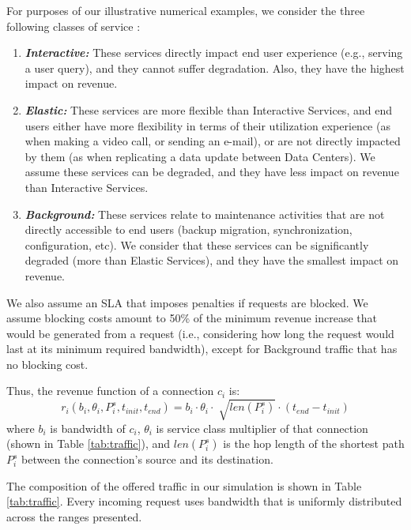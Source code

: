 \documentclass[journal]{IEEEtran}
\begin{document}
For purposes of our illustrative numerical examples, we consider the three following classes of service \cite{hong2013achieving}: 
\begin{enumerate}
\item \textit{\textbf{Interactive:}} These services directly impact end user experience (e.g., serving a user query), and they cannot suffer degradation. Also, they have the highest impact on revenue.

\item \textit{\textbf{Elastic:}} These services are more flexible than Interactive Services, and end users either have more flexibility in terms of their utilization experience (as when making a video call, or sending an e-mail), or are not directly impacted by them (as when replicating a data update between Data Centers). We assume these services can be degraded, and they have less impact on revenue than Interactive Services.

\item \textit{\textbf{Background:}} These services relate to maintenance activities that are not directly accessible to end users (backup migration, synchronization, configuration, etc). We consider that these services can be significantly degraded (more than Elastic Services), and they have the smallest impact on revenue.
\end{enumerate}

We also assume an SLA that imposes penalties if requests are blocked. We assume blocking costs amount to 50\% of the minimum revenue increase that would be generated from a request (i.e., considering how long the request would last at its minimum required bandwidth), except for Background traffic that has no blocking cost.

Thus, the revenue function of a connection $c_i$ is:
$$r_i(b_i, \theta_i, P_i^s, t_{init}, t_{end}) = b_i \cdot \theta_i \cdot \sqrt[]{len(P_i^s)} \cdot (t_{end} - t_{init})$$
where $b_i$ is bandwidth of $c_i$, $\theta_i$ is service class multiplier of that connection (shown in Table \ref{tab:traffic}), and $len(P_i^s)$ is the hop length of the shortest path $P_i^s$ between the connection's source and its destination.

The composition of the offered traffic in our simulation is shown in Table \ref{tab:traffic}. Every incoming request uses bandwidth that is uniformly distributed across the ranges presented.
\end{document}
